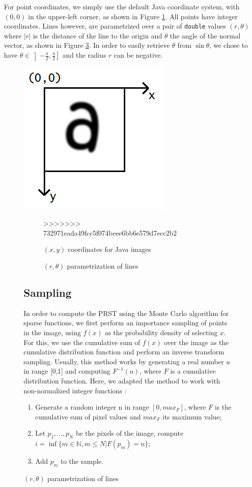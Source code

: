 \documentclass[10pt,a4paper]{article}			%
\begin{document}
For point coordinates, we simply use the default Java coordinate system, with $(0,0)$ in the upper-left corner, as shown in Figure \ref{coordinates}. All points have integer coordinates. Lines however, are parametrized over a pair of \texttt{double} values $(r,\theta)$ where $|r|$ is the distance of the line to the origin and $\theta$ the angle of the normal vector, as shown in Figure \ref{lines_parametrization}. In order to easily retrieve $\theta$ from $\sin\theta$, we chose to have $\theta\in\left]-\frac{\pi}{2},\frac{\pi}{2}\right]$ and the radius $r$ can be negative.
\begin{figure}[h]
\includegraphics[scale=0.7]{img/coordinates.png}

\begin{figure}[h]

>>>>>>> 732971eada49fcc5f074beee6bb6e579d7ecc2b2
\caption{$(x,y)$ coordinates for Java images}
\label{coordinates}	
\end{figure}

\begin{figure}[h]	
	
\caption{$(r,\theta)$ parametrization of lines}
\label{lines_parametrization}
\end{figure}

	\subsection{Sampling}
In order to compute the PRST using the Monte Carlo algorithm for sparse functions, we first perform an importance sampling of points in the image, using $f(x)$  as the probability density of selecting $x$. For this, we use the cumulative sum of $f(x)$ over the image as the cumulative distribution function and perform an inverse transform sampling. Usually, this method works by generating a real number $u$ in range [0,1] and computing $F^{-1}(u)$, where $F$ is a cumulative distribution function. Here, we adapted the method to work with non-normalized integer functions :
\begin{enumerate}
\item Generate a random integer n in range $[0,max_F]$, where $F$ is the cumulative sum of pixel values and $max_F$ its maximum value;
\item Let $p_1,...,p_N$ be the pixels of the image, compute $i=\inf\{m\in \mathbb{N}, m\leq N |  F(p_m) = n\}$;
\item Add $p_m$ to the sample.
\end{enumerate}




\end{figure}
\end{document}
